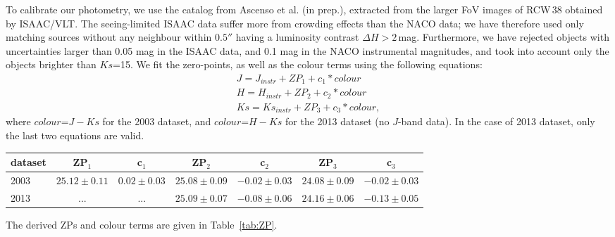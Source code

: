 \documentclass[a4paper,fleqn,usenatbib]{mnras}
\begin{document}
To calibrate our photometry, we use the catalog from Ascenso et al. (in prep.), extracted from the 
larger FoV images of RCW\,38 obtained by ISAAC/VLT. The seeing-limited ISAAC data suffer more from crowding effects than
the NACO data; 
we have therefore used only matching sources without any neighbour within $0.5''$ having a luminosity contrast $\Delta H>2$\,mag.
Furthermore, we have rejected objects with uncertainties larger than 0.05 mag
in the ISAAC data, and 0.1 mag in the NACO instrumental magnitudes, and took into account only the objects brighter than $Ks$=15.
We fit the zero-points, as well as the colour terms using the following
equations:
\begin{equation}
\begin{aligned}
 J= J_{instr} + ZP_1 + c_1*colour\\
 H = H_{instr} + ZP_2 + c_2*colour\\
 Ks = Ks_{instr} + ZP_3 + c_3*colour,
\end{aligned}
\end{equation}
where $colour$=$J-Ks$ for the 2003 dataset, and $colour$=$H-Ks$ for the 2013 dataset (no $J$-band data).
In the case of 2013 dataset, only the last two equations are valid.
\begin{table*}
\centering
\caption{Parameters of the NACO photometric calibration.}
\label{tab:ZP}
\begin{tabular}{lcccccc}
dataset & ZP$_1$ & c$_1$  & ZP$_2$ & c$_2$ & ZP$_3$ & c$_3$ \\
\hline
2003 & $25.12\pm0.11$ & $0.02\pm0.03$ & $25.08\pm0.09$ & $-0.02\pm0.03$ & $24.08\pm0.09$ & $-0.02\pm0.03$\\
2013 & ... & ...  & $25.09\pm0.07$ & $-0.08\pm0.06$ & $24.16\pm0.06$ & $-0.13\pm0.05$\\
\hline 
\end{tabular}
\end{table*}
The derived ZPs and colour terms are given in Table~\ref{tab:ZP}.
\end{document}
